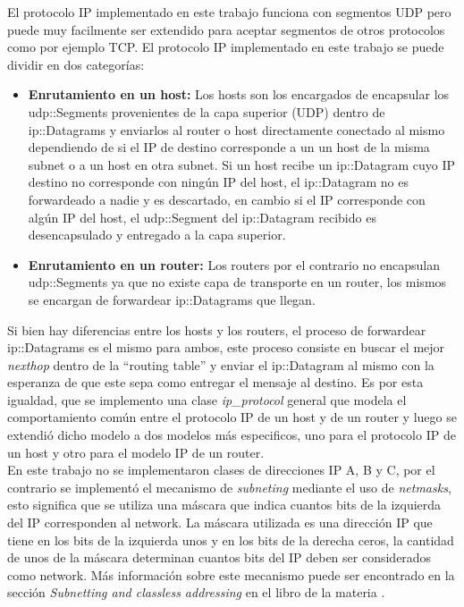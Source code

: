 \documentclass[10pt,a4paper]{article}
\begin{document}
El protocolo IP implementado en este trabajo funciona con segmentos UDP pero puede muy facilmente ser extendido para aceptar segmentos de otros protocolos como por ejemplo TCP. El protocolo IP implementado en este trabajo se puede dividir en dos categorías:
\begin{itemize}
\item \textbf{Enrutamiento en un host:} Los hosts son los encargados de encapsular los udp::Segments provenientes de la capa superior (UDP) dentro de ip::Datagrams y enviarlos al router o host directamente conectado al mismo dependiendo de si el IP de destino corresponde a un un host de la misma subnet o a un host en otra subnet. Si un host recibe un ip::Datagram cuyo IP destino no corresponde con ningún IP del host, el ip::Datagram no es forwardeado a nadie y es descartado, en cambio si el IP corresponde con algún IP del host, el udp::Segment del ip::Datagram recibido es desencapsulado y entregado a la capa superior.
\item \textbf{Enrutamiento en un router:} Los routers por el contrario no encapsulan udp::Segments ya que no existe capa de transporte en un router, los mismos se encargan de forwardear ip::Datagrams que llegan.
\end{itemize}

Si bien hay diferencias entre los hosts y los routers, el proceso de forwardear ip::Datagrams es el mismo para ambos, este proceso consiste en buscar el mejor \textit{nexthop} dentro de la ``routing table'' y enviar el ip::Datagram al mismo con la esperanza de que este sepa como entregar el mensaje al destino. Es por esta igualdad, que se implemento una clase \textit{ip\_protocol} general que modela el comportamiento común entre el protocolo IP de un host y de un router y luego se extendió dicho modelo a dos modelos más especificos, uno para el protocolo IP de un host y otro para el modelo IP de un router.\\

En este trabajo no se implementaron clases de direcciones IP A, B y C, por el contrario se implementó el mecanismo de \textit{subneting} mediante el uso de \textit{netmasks}, esto significa que se utiliza una máscara que indica cuantos bits de la izquierda del IP corresponden al network. La máscara utilizada es una dirección IP que tiene en los bits de la izquierda unos y en los bits de la derecha ceros, la cantidad de unos de la máscara determinan cuantos bits del IP deben ser considerados como network. Más información sobre este mecanismo puede ser encontrado en la sección \textit{Subnetting and classless addressing} en el libro de la materia \cite[p.~220]{peterson2011computer}. \\
\end{document}
